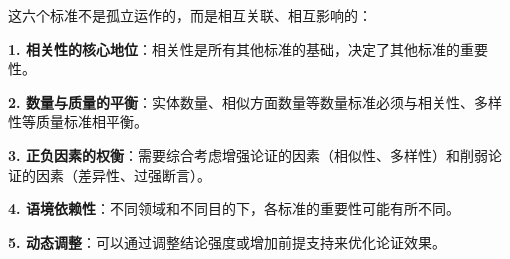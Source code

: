 \begin{theorembox}[title=标准间的相互关系与综合评价]
这六个标准不是孤立运作的，而是相互关联、相互影响的：

\textbf{1. 相关性的核心地位}：相关性是所有其他标准的基础，决定了其他标准的重要性。

\textbf{2. 数量与质量的平衡}：实体数量、相似方面数量等数量标准必须与相关性、多样性等质量标准相平衡。

\textbf{3. 正负因素的权衡}：需要综合考虑增强论证的因素（相似性、多样性）和削弱论证的因素（差异性、过强断言）。

\textbf{4. 语境依赖性}：不同领域和不同目的下，各标准的重要性可能有所不同。

\textbf{5. 动态调整}：可以通过调整结论强度或增加前提支持来优化论证效果。
\end{theorembox}

